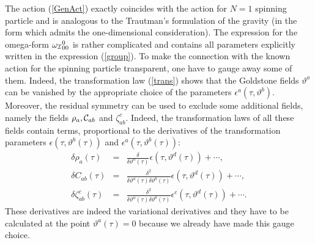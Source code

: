 \documentclass[a4paper,twocolumn,showpacs,preprintnumbers,amsmath,amssymb]{revtex4}
\begin{document}
The action (\ref{GenAct}) exactly coincides with the action
for $N=1$ spinning particle\cite{P2} and is
analogous to the Trautman's formulation\cite{T} of the gravity
(in the form which admits the one-dimensional
consideration\cite{P_0}). The expression for the omega-form
${\omega_{\cal I}}^0_{00}$ is rather complicated and
contains all parameters explicitly written in the expression (\ref{group}).
To make the connection with the known action for the spinning
particle transparent, one have to  gauge away some of them. Indeed, the
transformation law (\ref{trans}) shows that the Goldstone fields
$\vartheta^a$ can be  vanished by the appropriate choice of the
parameters $\epsilon^a(\tau,\vartheta^b)$. Moreover, the
residual symmetry can be used to exclude some additional fields\cite{P_0},
namely the fields $\rho_a, {\cal C}_{ab}$ and $\zeta_{ab}^c$.
Indeed, the transformation laws of all these fields contain terms,
proportional to the derivatives of the transformation parameters
$\epsilon(\tau,\vartheta^b(\tau))$ and $
\epsilon^a(\tau,\vartheta^b(\tau))$\cite{P_0}:
\begin{eqnarray}\label{highTrans}
\delta\rho_a(\tau)&=&\frac{\delta}{\delta\vartheta^a(\tau)}
\epsilon(\tau,\vartheta^d(\tau))+\cdots ,\\
\delta C_{ab}(\tau)&=&\frac{\delta^2}
{\delta\vartheta^a(\tau)\delta\vartheta^b(\tau)}
\epsilon(\tau,\vartheta^d(\tau))+\cdots ,\\
\delta\zeta_{ab}^c(\tau)&=&\frac{\delta^2}
{\delta\vartheta^a(\tau)\delta\vartheta^b(\tau)}
\epsilon^c(\tau,\vartheta^d(\tau))+\cdots .
\end{eqnarray}
These derivatives are indeed the variational derivatives and they have to be calculated
at the point $\vartheta^a(\tau)=0$ because we already have made this gauge choice.
\end{document}
